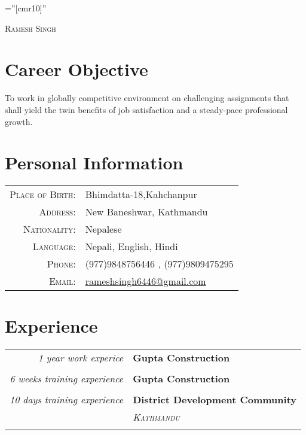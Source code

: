 \documentclass[a4paper,10pt]{article}
\begin{document}

\pagestyle{empty} %

\font\fb=''[cmr10]'' %

\par{\centering
		{\huge \textsc{Ramesh} \textsc{Singh}
	}\bigskip\par}


\section{Career Objective}
To work in globally competitive environment on challenging assignments that shall yield the twin benefits of job satisfaction and a steady-pace professional growth.

\section{Personal Information}
\begin{tabular}{rl}
    \textsc{Place of Birth:} & Bhimdatta-18,Kahchanpur \\
    \textsc{Address:}   & New Baneshwar, Kathmandu \\
    \textsc{Nationality:} & Nepalese\\
    \textsc{Language:} & Nepali, English, Hindi\\
    \textsc{Phone:}     & (977)9848756446 , (977)9809475295\\
    \textsc{Email:}     & \href{mailto:rameshsingh6446@gmail.com}{rameshsingh6446@gmail.com}\\
\end{tabular}

\section{Experience}
\begin{tabular}{r|p{11cm}}
\emph{1 year work experice} & \textbf{Gupta Construction}\\\multicolumn{2}{c}{} \\
 \emph{6 weeks training experience} & \textbf{Gupta Construction}\\\multicolumn{2}{c}{} \\
 \emph{10 days training experience} & \textbf{District Development Community }\\ & \emph{\textsc{Kathmandu}}\\\multicolumn{2}{c}{} \\
\end{tabular}
\end{document}
